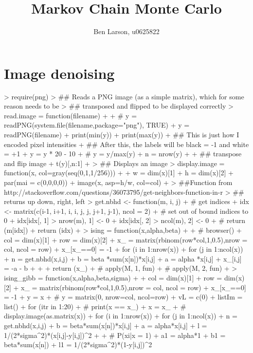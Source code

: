 \documentclass{article}
\title{Markov Chain Monte Carlo }
\author{Ben Larson, u0625822}
\begin{document}



\section{Image denoising }

\begin{Schunk}
\begin{Sinput}
> require(png)
> ## Reads a PNG image (as a simple matrix), which for some reason needs to be
> ## transposed and flipped to be displayed correctly
> read.image = function(filename)
+ {
+   # y = readPNG(system.file(filename,package="png"), TRUE)
+   y = readPNG(filename)
+   print(min(y))
+   print(max(y)) 
+   ## This is just how I encoded pixel intensities
+   ## After this, the labels will be black = -1 and white = +1
+   y = y * 20 - 10
+   # y = y/max(y) 
+   n = nrow(y)
+   
+   ## transpose and flip image
+   t(y)[,n:1]
+ }
> ## Displays an image
> display.image = function(x, col=gray(seq(0,1,1/256)))
+ {
+   w = dim(x)[1]
+   h = dim(x)[2]
+   par(mai = c(0,0,0,0))
+   image(x, asp=h/w, col=col)
+ }
> ##Function from http://stackoverflow.com/questions/36073795/get-neighbors-function-in-r
> ## returns up down, right, left 
> get.nbhd <- function(m, i, j) {
+   # get indices
+   idx <- matrix(c(i-1, i+1, i, i, j, j, j+1, j-1), ncol = 2)
+   # set out of bound indices to 0
+   idx[idx[, 1] > nrow(m), 1] <- 0
+   idx[idx[, 2] > ncol(m), 2] <- 0
+   # return (m[idx])
+   return (idx)
+ }
> ising = function(x,alpha,beta) 
+ {
+   # browser()
+   col = dim(x)[1]
+   row = dim(x)[2]
+   x_ = matrix(rbinom(row*col,1,0.5),nrow = col, ncol = row) 
+   x_[x_==0] = -1 
+   for (i in 1:nrow(x)){
+     for (j in 1:ncol(x)){
+       n = get.nbhd(x,i,j)
+       b = beta *sum(x[n])*x[i,j]
+       a = alpha *x[i,j]
+       x_[i,j] = -a - b 
+     }
+   }
+   return (x_) 
+  # apply(M, 1, fun)
+  # apply(M, 2, fun)
+ }
> ising_gibb = function(x,alpha,beta,sigma) 
+ {
+   col = dim(x)[1]
+   row = dim(x)[2]
+   x_ = matrix(rbinom(row*col,1,0.5),nrow = col, ncol = row) 
+   x_[x_==0] = -1 
+   y = x
+   # y = matrix(0, nrow=col, ncol=row) 
+   vL = c(0) 
+   listIm = list() 
+   for (itr in 1:20) {
+     # print(x == x_)
+     x = x_
+     # display.image(as.matrix(x))
+     for (i in 1:nrow(x)){
+       for (j in 1:ncol(x)){
+         n = get.nbhd(x,i,j)
+         b = beta*sum(x[n])*x[i,j] 
+         a = alpha*x[i,j] 
+         l = 1/(2*sigma^2)*(x[i,j]-y[i,j])^2
+        
+         # P(xi|x = 1)
+         a1 = alpha*1
+         b1 = beta*sum(x[n])
+         l1 = 1/(2*sigma^2)*(1-y[i,j])^2
}}}}
\end{Sinput}
\end{Schunk}
\end{document}
